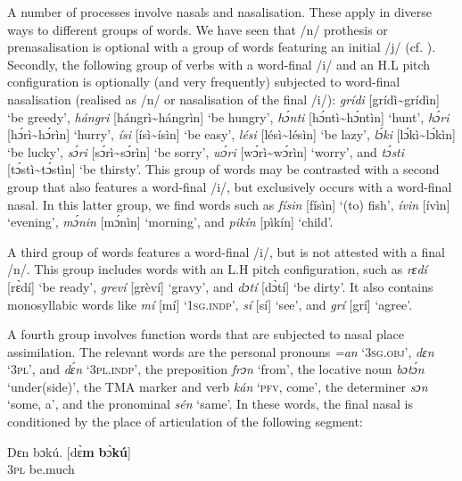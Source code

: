 A number of processes involve nasals and nasalisation. These apply in diverse ways to different groups of words. We have seen that /n/ prothesis or prenasalisation is optional with a group of words featuring an initial /j/ (cf. ). Secondly, the following group of verbs with a word-final /i/ and an H.L pitch configuration is optionally (and very frequently) subjected to word-final nasalisation (realised as /n/ or nasalisation of the final /i/): \textit{grídi} [grídì{\textasciitilde}grídìn] ‘be greedy’, \textit{hángri} [hángrì{\textasciitilde}hángrìn] ‘be hungry’, \textit{hɔ́nti} [hɔ́ntì{\textasciitilde}hɔ́ntìn] ‘hunt’, \textit{hɔ́ri} [hɔ́rì{\textasciitilde}hɔ́rìn] ‘hurry’, \textit{ísi} [ísì{\textasciitilde}ísìn] ‘be easy’, \textit{lési} [lésì{\textasciitilde}lésìn] ‘be lazy’, \textit{lɔ́ki} [lɔ́kì{\textasciitilde}lɔ́kìn] ‘be lucky’, \textit{sɔ́ri} [sɔ́rì{\textasciitilde}sɔ́rìn] ‘be sorry’, \textit{wɔ́ri} [wɔ́rì{\textasciitilde}wɔ́rìn] ‘worry’, and \textit{tɔ́sti} [tɔ́stì{\textasciitilde}tɔ́stìn] ‘be thirsty’. This group of words may be contrasted with a second group that also features a word-final /i/, but exclusively occurs with a word-final nasal. In this latter group, we find words such as \textit{físin} [físìn] ‘(to) fish’, \textit{ívin} [ívìn] ‘evening’, \textit{mɔ́nin} [mɔ́nìn] ‘morning’, and \textit{pikín} [pìkín] ‘child’.


A third group of words features a word-final /i/, but is not attested with a final /n/. This group includes words with an L.H pitch configuration, such as \textit{rɛdí} [rɛ̀dí] ‘be ready’, \textit{greví} [grèví] ‘gravy’, and \textit{dɔtí} [dɔ̀tí] ‘be dirty’. It also contains monosyllabic words like \textit{mí} [mí] ‘\textsc{1sg.indp}’, \textit{sí} [sí] ‘see’, and \textit{grí} [grí] ‘agree’. 



A fourth group involves function words that are subjected to nasal place assimilation. The relevant words are the personal pronouns \textit{=an} ‘\textsc{3sg.obj}’, \textit{dɛn} ‘\textsc{3pl}’, and \textit{dɛ́n} ‘\textsc{3pl.indp}’, the preposition \textit{frɔn} ‘from’, the locative noun{\fff} \textit{bɔtɔ́n} ‘under(side)’, the TMA marker and verb \textit{kán} ‘\textsc{pfv}, come’, the determiner \textit{sɔn} ‘some, a’, and the pronominal \textit{sén} ‘same’. In these words, the final nasal is conditioned by the place of articulation of the following segment:



\ea%
    \label{ex:key:27}
    \gll   Dɛn    bɔkú.           \textup{[dɛ̀\textbf{m}  \textbf{b}ɔ̀\textbf{\textmd{kú}}]}\\
\textsc{3pl}    be.much\\

